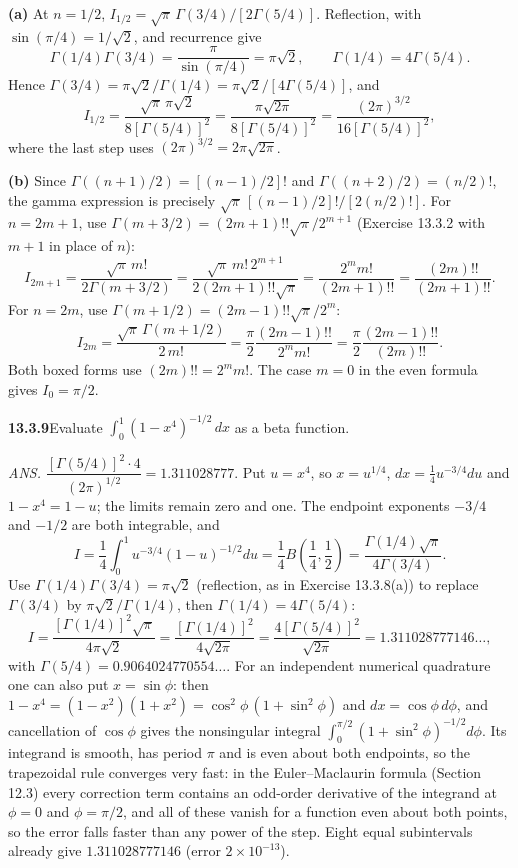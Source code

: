 \textbf{(a)} At $n=1/2$,
$I_{1/2}=\sqrt\pi\,\Gamma(3/4)/[2\Gamma(5/4)]$.
Reflection, with $\sin(\pi/4)=1/\sqrt2$, and recurrence give
\[
\Gamma(1/4)\Gamma(3/4)=\frac{\pi}{\sin(\pi/4)}=\pi\sqrt2,
\qquad\Gamma(1/4)=4\Gamma(5/4).
\]
Hence $\Gamma(3/4)=\pi\sqrt2/\Gamma(1/4)=\pi\sqrt2/[4\Gamma(5/4)]$,
and
\[
\boxed{I_{1/2}=\frac{\sqrt\pi\,\pi\sqrt2}{8[\Gamma(5/4)]^2}
=\frac{\pi\sqrt{2\pi}}{8[\Gamma(5/4)]^2}
=\frac{(2\pi)^{3/2}}{16[\Gamma(5/4)]^2}},
\]
where the last step uses $(2\pi)^{3/2}=2\pi\sqrt{2\pi}$.

\textbf{(b)} Since $\Gamma((n+1)/2)=[(n-1)/2]!$ and
$\Gamma((n+2)/2)=(n/2)!$, the gamma expression is precisely
$\sqrt\pi\,[(n-1)/2]!/[2(n/2)!]$.  For $n=2m+1$, use
$\Gamma(m+3/2)=(2m+1)!!\sqrt\pi/2^{m+1}$
(Exercise 13.3.2 with $m+1$ in place of $n$):
\[
I_{2m+1}=\frac{\sqrt\pi\,m!}{2\Gamma(m+3/2)}
=\frac{\sqrt\pi\,m!\,2^{m+1}}{2(2m+1)!!\sqrt\pi}
=\frac{2^mm!}{(2m+1)!!}
=\boxed{\frac{(2m)!!}{(2m+1)!!}}.
\]
For $n=2m$, use $\Gamma(m+1/2)=(2m-1)!!\sqrt\pi/2^m$:
\[
I_{2m}=\frac{\sqrt\pi\,\Gamma(m+1/2)}{2\,m!}
=\frac\pi2\frac{(2m-1)!!}{2^mm!}
=\boxed{\frac\pi2\frac{(2m-1)!!}{(2m)!!}}.
\]
Both boxed forms use $(2m)!!=2^mm!$.
The case $m=0$ in the even formula gives $I_0=\pi/2$.


\par\bigskip
\noindent\textbf{13.3.9}\quad Evaluate
$\displaystyle\int_{0}^{1}(1-x^{4})^{-1/2}\,dx$ as a beta function.
\par\nobreak\hfill\emph{ANS.}\enspace
$\dfrac{[\Gamma(5/4)]^{2}\cdot4}{(2\pi)^{1/2}}=1.311028777$.
\solution
Put $u=x^4$, so $x=u^{1/4}$, $dx=\tfrac14u^{-3/4}du$ and
$1-x^4=1-u$; the limits remain zero and one.  The endpoint
exponents $-3/4$ and $-1/2$ are both integrable, and
\[
I=\frac14\int_0^1u^{-3/4}(1-u)^{-1/2}du
=\boxed{\frac14B\left(\frac14,\frac12\right)}
=\frac{\Gamma(1/4)\sqrt\pi}{4\Gamma(3/4)}.
\]
Use $\Gamma(1/4)\Gamma(3/4)=\pi\sqrt2$ (reflection, as in
Exercise 13.3.8(a)) to replace $\Gamma(3/4)$ by
$\pi\sqrt2/\Gamma(1/4)$, then $\Gamma(1/4)=4\Gamma(5/4)$:
\[
I=\frac{[\Gamma(1/4)]^2\sqrt\pi}{4\pi\sqrt2}
=\frac{[\Gamma(1/4)]^2}{4\sqrt{2\pi}}
=\boxed{\frac{4[\Gamma(5/4)]^2}{\sqrt{2\pi}}}
=1.311028777146\ldots,
\]
with $\Gamma(5/4)=0.9064024770554\ldots$.
For an independent numerical quadrature one can also put
$x=\sin\phi$: then $1-x^4=(1-x^2)(1+x^2)=\cos^2\phi\,(1+\sin^2\phi)$
and $dx=\cos\phi\,d\phi$, and cancellation of $\cos\phi$ gives the
nonsingular integral $\int_0^{\pi/2}(1+\sin^2\phi)^{-1/2}d\phi$.
Its integrand is smooth, has period $\pi$ and is even about both
endpoints, so the trapezoidal rule converges very fast: in the
Euler--Maclaurin formula (Section 12.3) every correction term
contains an odd-order derivative of the integrand at $\phi=0$ and
$\phi=\pi/2$, and all of these vanish for a function even about
both points, so the error falls faster than any power of the
step.  Eight equal subintervals already give
$1.311028777146$ (error $2\times10^{-13}$).


